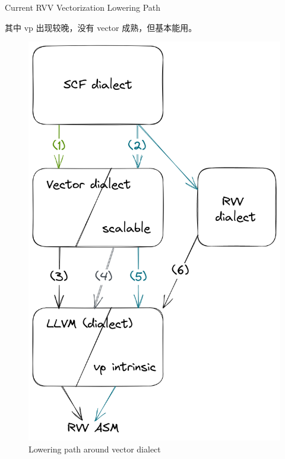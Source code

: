 \documentclass[aspectratio=169]{ctexbeamer}
\begin{document}
\begin{frame}{Current RVV Vectorization Lowering Path}
\begin{minipage}[t]{0.5\textwidth}
        其中 vp 出现较晚，没有 vector 成熟，但基本能用。
    \end{minipage}%
    \begin{minipage}[t]{0.5\textwidth}
        \begin{figure}
            \centering
            \includegraphics[width=0.5\linewidth]{images/lowering-path-around-vector.png}
            \caption{Lowering path around vector dialect}
        \end{figure}
    \end{minipage}
\end{frame}
\end{document}
